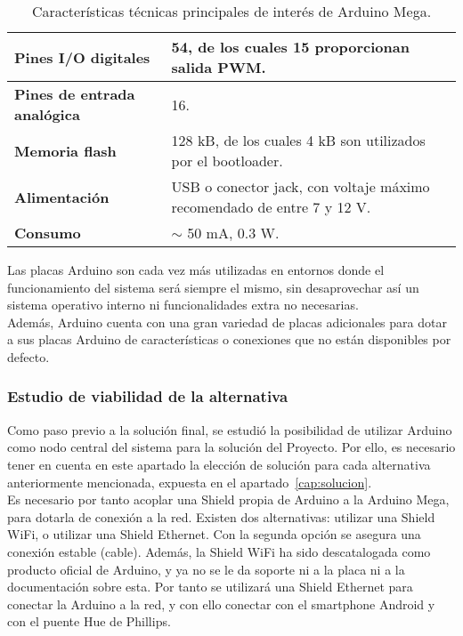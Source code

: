         \begin{table}[!ht]
            \centering
            {
            \begin{tabularx}{\textwidth}{|l|X|}
                \hline
                \textbf{Pines I/O digitales} & 54, de los cuales 15 proporcionan salida PWM. \\ \hline
                \textbf{Pines de entrada analógica} & 16. \\ \hline
                \textbf{Memoria flash} & 128 kB, de los cuales 4 kB son utilizados por el bootloader. \\
                \hline
                \textbf{Alimentación} & USB o conector jack, con voltaje máximo recomendado de entre 7 y 12 V. \\ \hline
                \textbf{Consumo} & $\sim$ 50 mA, 0.3 W. \\ \hline
            \end{tabularx}
            }
            \caption{Características técnicas principales de interés de Arduino Mega.}
            \label{tab:arduino}
        \end{table}

        Las placas Arduino son cada vez más utilizadas en entornos donde el funcionamiento del sistema será siempre el mismo, sin desaprovechar así un sistema operativo interno ni funcionalidades extra no necesarias. \\

        Además, Arduino cuenta con una gran variedad de placas adicionales para dotar a sus placas Arduino de características o conexiones que no están disponibles por defecto.

        \subsubsection{Estudio de viabilidad de la alternativa}

        Como paso previo a la solución final, se estudió la posibilidad de utilizar Arduino como nodo central del sistema para la solución del Proyecto. Por ello, es necesario tener en cuenta en este apartado la elección de solución para cada alternativa anteriormente mencionada, expuesta en el apartado~\ref{cap:solucion}. \\

        Es necesario por tanto acoplar una Shield propia de Arduino a la Arduino Mega, para dotarla de conexión a la red. Existen dos alternativas: utilizar una Shield WiFi, o utilizar una Shield Ethernet. Con la segunda opción se asegura una conexión estable (cable). Además, la Shield WiFi ha sido descatalogada como producto oficial de Arduino, y ya no se le da soporte ni a la placa ni a la documentación sobre esta. Por tanto se utilizará una Shield Ethernet para conectar la Arduino a la red, y con ello conectar con el smartphone Android y con el puente Hue de Phillips. \\

